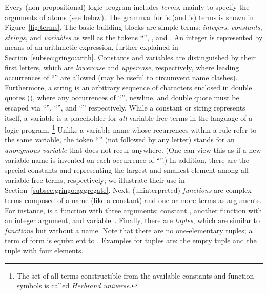 Every (non-propositional) logic program includes \emph{terms},
mainly to specify the arguments of atoms (see below).
The grammar for \gringo's (and \clingo's) terms is shown in Figure~\ref{fig:terms}.
The basic building blocks are simple terms:
\emph{integers}, \emph{constants}, \emph{strings}, and \emph{variables}
as well as the tokens ``'', , and .
An integer is represented by means of an arithmetic expression,
further explained in Section~\ref{subsec:gringo:arith}.
Constants and variables are distinguished by their first letters,
which are \emph{lowercase} and \emph{uppercase}, respectively,
where leading occurrences of ``'' are allowed
(may be useful to circumvent name clashes).
Furthermore, a string is an arbitrary sequence of characters
enclosed in double quotes (),
where any occurrences of ``\code{\textbackslash}'', newline, and double quote %
must be escaped via ``\code{\textbackslash\textbackslash}'', ``'',
and ``'' respectively.
While a constant or string represents itself,
a variable is a placeholder for \emph{all} variable-free terms
in the language of a logic program.%
\footnote{The set of all terms constructible from the available
          constants and function symbols is called \emph{Herbrand universe}.}
Unlike %
a variable name whose recurrences within a rule refer to the same variable,
the token ``'' (not followed by any letter)
stands for an \emph{anonymous variable} that does not recur anywhere.
(One can view this as if a new variable name is invented on each
 occurrence of ``''.)
In addition, there are the special constants  and 
representing the largest and smallest element among all variable-free terms, respectively;
we illustrate their use in Section~\ref{subsec:gringo:aggregate}.
Next, (uninterpreted) \emph{functions} are complex terms composed of a name (like a constant)
and one or more terms as arguments. %
For instance,
is a function with three arguments:
constant , another function 
with an integer argument, and variable~.
Finally, there are \emph{tuples}, which are similar to \emph{functions} but without a name.
Note that there are no one-elementary tuples; a term of form  is equivalent to .
Examples for tuples are:
the empty tuple \code{()} and
the tuple  with four elements.

